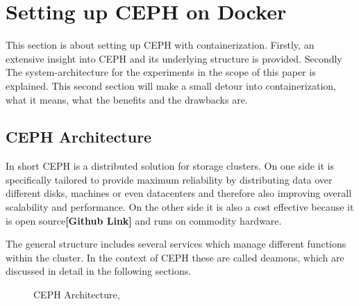 \documentclass[titlepage, a4paper, 11pt]{scrartcl}
\begin{document}
    \section{Setting up CEPH on Docker}

        This section is about setting up CEPH with containerization. Firstly, an extensive insight into CEPH and its underlying
        structure is provided. Secondly The system-architecture for the experiments in the scope of this paper is explained.
        This second section will make a small detour into containerization, what it means, what the benefits and the drawbacks are.

        \subsection{CEPH Architecture}

            In short CEPH is a distributed solution for storage clusters. On one side it is specifically tailored to provide
            maximum reliability by distributing data over different disks, machines or even datacenters and therefore also 
            improving overall scalability and performance. On the other side it is also a cost effective because it is open source\textbf{[Github Link]}
            and runs on commodity hardware. 

            The general structure includes several services which manage different functions within the cluster. In the context of
            CEPH these are called deamons, which are discussed in detail in the following sections.

            \begin{figure}%
                \centering
                \caption{CEPH Architecture, \cite{hadlich_2015}}
                \label{fig:ceph-arch}
            \end{figure}
            
\end{document}
